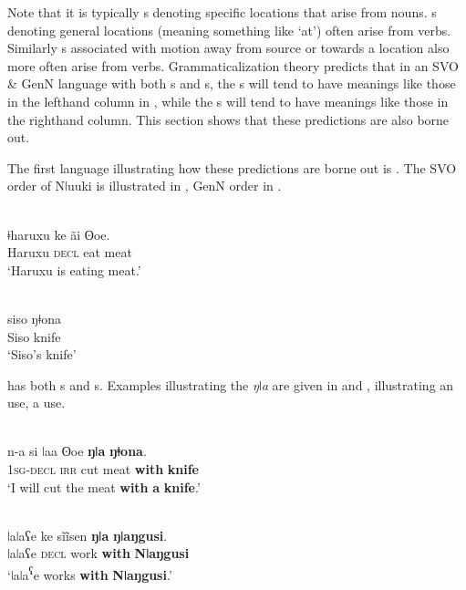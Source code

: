 \documentclass[output=paper]{langsci/langscibook}
\begin{document}
Note that it is typically s denoting specific locations that arise from nouns. s denoting general locations (meaning something like ‘at’) often arise from verbs. Similarly s associated with motion away from source or towards a location also more often arise from verbs. Grammaticalization theory predicts that in an SVO \& GenN language with both s and s, the s will tend to have meanings like those in the lefthand column in , while the s will tend to have meanings like those in the righthand column. This section shows that these predictions are also borne out.

The first language illustrating how these predictions are borne out is . The SVO order of Nǀuuki is illustrated in , GenN order in .

\ea\label{ex:dryer:11}
\\
\gll ǂharuxu    ke  ãi  ʘoe.\\
       Haruxu  \textsc{decl}  eat  meat \\
\glt ‘Haruxu is eating meat.’  
\z

\ea\label{ex:dryer:12}
\\
\gll siso  ŋǂona\\
       Siso  knife\\
\glt   ‘Siso’s knife’
\z

\noindent {} has both s and s. Examples illustrating the  \textit{ŋ}ǀ\textit{a} are given in  and ,  illustrating an  use,  a  use.

\ea\label{ex:dryer:13}
\\
\gll n-a  si  ǀaa  ʘoe  \textbf{ŋǀa}  \textbf{ŋǂona}.\\
       1\textsc{sg-decl}  \textsc{irr}  cut  meat  \textbf{with}  \textbf{knife}  \\
\glt ‘I will cut the meat \textbf{with} \textbf{a} \textbf{knife}.’  
\z

\ea\label{ex:dryer:14}
\\
\gll ǀaǀaʕe  ke  sĩĩsen  \textbf{ŋǀa} \textbf{ŋǀaŋgusi}.\\
       ǀaǀaʕe  \textsc{decl}  work  \textbf{with}  \textbf{Nǀaŋgusi}  \\
\glt ‘ǀaǀa\textsuperscript{ʕ}e works \textbf{with} \textbf{Nǀaŋgusi}.’  
\z
\end{document}
